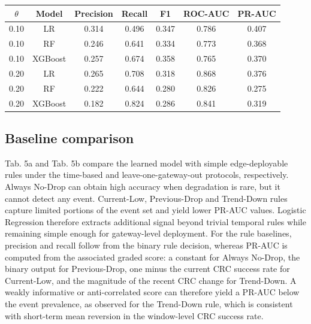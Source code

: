 \documentclass{jot}
\begin{document}
\begin{table}[t]
\centering
\begin{tabular}{@{}ccccccc@{}}
\toprule
$\theta$ & Model & Precision & Recall & F1 & ROC-AUC & PR-AUC \\
\midrule
0.10 & LR & 0.314 & 0.496 & 0.347 & 0.786 & 0.407 \\
0.10 & RF & 0.246 & 0.641 & 0.334 & 0.773 & 0.368 \\
0.10 & XGBoost & 0.257 & 0.674 & 0.358 & 0.765 & 0.370 \\
0.20 & LR & 0.265 & 0.708 & 0.318 & 0.868 & 0.376 \\
0.20 & RF & 0.222 & 0.644 & 0.280 & 0.826 & 0.275 \\
0.20 & XGBoost & 0.182 & 0.824 & 0.286 & 0.841 & 0.319 \\
\bottomrule
\end{tabular}
\end{table}

\subsection{Baseline comparison}\label{s:4.3}
Tab. 5a and Tab. 5b compare the learned model with simple edge-deployable rules under the time-based and leave-one-gateway-out protocols, respectively. Always No-Drop can obtain high accuracy when degradation is rare, but it cannot detect any event. Current-Low, Previous-Drop and Trend-Down rules capture limited portions of the event set and yield lower PR-AUC values. Logistic Regression therefore extracts additional signal beyond trivial temporal rules while remaining simple enough for gateway-level deployment. For the rule baselines, precision and recall follow from the binary rule decision, whereas PR-AUC is computed from the associated graded score: a constant for Always No-Drop, the binary output for Previous-Drop, one minus the current CRC success rate for Current-Low, and the magnitude of the recent CRC change for Trend-Down. A weakly informative or anti-correlated score can therefore yield a PR-AUC below the event prevalence, as observed for the Trend-Down rule, which is consistent with short-term mean reversion in the window-level CRC success rate.
\end{document}

